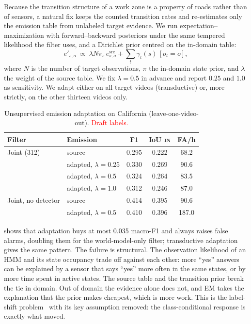\documentclass[conference]{IEEEtran}
\newcommand{\st}[1]{\textsc{#1}}
\newcommand{\draftnote}[1]{\textcolor{red}{#1}}
\begin{document}
Because the transition structure of a work zone is a property of roads rather than of sensors, a natural fix keeps the counted transition rates and re-estimates only the emission table from unlabeled target evidence. We run expectation--maximization with forward--backward posteriors under the same tempered likelihood the filter uses, and a Dirichlet prior centred on the in-domain table:
\[
e'_{s,o} \;\propto\; \lambda N \pi_s\, e^\text{src}_{s,o} + \textstyle\sum_t \gamma_t(s)\,[o_t = o],
\]
where $N$ is the number of target observations, $\pi$ the in-domain state prior, and $\lambda$ the weight of the source table. We fix $\lambda{=}0.5$ in advance and report $0.25$ and $1.0$ as sensitivity. We adapt either on all target videos (transductive) or, more strictly, on the other thirteen videos only.

\begin{table}[t]
\centering
\caption{Unsupervised emission adaptation on California (leave-one-video-out). \draftnote{Draft labels.}}
\label{tab:adapt}
\footnotesize
\setlength{\tabcolsep}{4pt}
\begin{tabular}{@{}llccc@{}}
\toprule
Filter & Emission & F1 & IoU \st{in} & FA/h \\
\midrule
Joint (312) & source & 0.295 & 0.222 & 68.2 \\
 & adapted, $\lambda{=}0.25$ & 0.330 & 0.269 & 90.6 \\
 & adapted, $\lambda{=}0.5$ & 0.324 & 0.264 & 83.5 \\
 & adapted, $\lambda{=}1.0$ & 0.312 & 0.246 & 87.0 \\
\midrule
Joint, no detector & source & 0.414 & 0.395 & 90.6 \\
 & adapted, $\lambda{=}0.5$ & 0.410 & 0.396 & 187.0 \\
\bottomrule
\end{tabular}
\end{table}

 shows that adaptation buys at most 0.035 macro-F1 and always raises false alarms, doubling them for the world-model-only filter; transductive adaptation gives the same pattern. The failure is structural. The observation likelihood of an HMM and its state occupancy trade off against each other: more ``yes'' answers can be explained by a sensor that says ``yes'' more often in the same states, or by more time spent in active states. The source table and the transition prior break the tie in domain. Out of domain the evidence alone does not, and EM takes the explanation that the prior makes cheapest, which is more work. This is the label-shift problem~\cite{saerens2002adjusting,lipton2018bbse} with its key assumption removed: the class-conditional response is exactly what moved.
\end{document}
